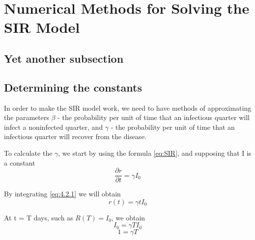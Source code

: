 \section{Numerical Methods for Solving the SIR Model}\label{Numerical_Methods}\thispagestyle{SectionFirstPage} %
\subsection{Yet another subsection}\label{multicollinearity}
\setlength{\parindent}{20pt}
\subsection{Determining the constants}
\hspace{\parindent}In order to make the SIR model work, we need to have methods of approximating the parameters $\beta$ - the probability
per unit of time that an infectious quarter will infect a noninfected quarter, and $\gamma$ - the probability
per unit of time that an infectious quarter will recover from the disease.
\par
\par To calculate the $\gamma$, we start by using the formula \ref{eq:SIR}, and supposing that I is a constant
\begin{equation}
	\frac{\partial r}{\partial t} = \gamma I_0 \label{eq:4.2.1}
\end{equation}
\par By integrating \ref{eq:4.2.1} we will obtain
\begin{equation}
	r(t) = \gamma t I_0 \label{eq:4.2.2}
\end{equation}
\par At t = T days, such as $R(T)=I_0$, we obtain
\begin{equation}
	I_0 = \gamma T I_0 \label{eq:4.2.3}
\end{equation}
\begin{equation}
	1 = \gamma T\label{eq:4.2.4}
\end{equation}

